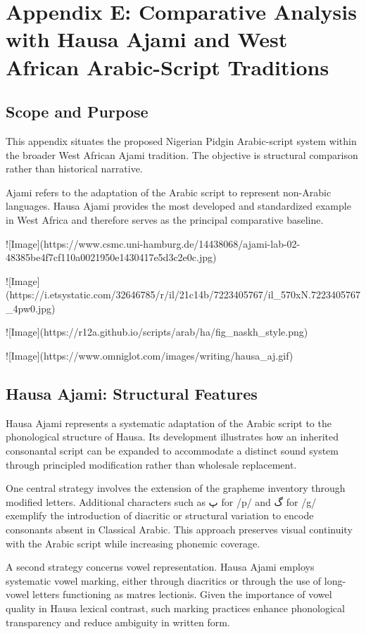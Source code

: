 \documentclass[12pt]{article}
\begin{document}
\section{Appendix E: Comparative Analysis with Hausa Ajami and West African Arabic-Script Traditions}

\subsection{Scope and Purpose}

This appendix situates the proposed Nigerian Pidgin Arabic-script system within the broader West African Ajami tradition. The objective is structural comparison rather than historical narrative.

Ajami refers to the adaptation of the Arabic script to represent non-Arabic languages. Hausa Ajami provides the most developed and standardized example in West Africa and therefore serves as the principal comparative baseline.

![Image](https://www.csmc.uni-hamburg.de/14438068/ajami-lab-02-48385be4f7cf110a0021950e1430417e5d3c2e0c.jpg)

![Image](https://i.etsystatic.com/32646785/r/il/21c14b/7223405767/il_570xN.7223405767_4pw0.jpg)

![Image](https://r12a.github.io/scripts/arab/ha/fig_naskh_style.png)

![Image](https://www.omniglot.com/images/writing/hausa_aj.gif)

\subsection{Hausa Ajami: Structural Features}

Hausa Ajami represents a systematic adaptation of the Arabic script to the phonological structure of Hausa. Its development illustrates how an inherited consonantal script can be expanded to accommodate a distinct sound system through principled modification rather than wholesale replacement.

One central strategy involves the extension of the grapheme inventory through modified letters. Additional characters such as پ for /p/ and گ for /g/ exemplify the introduction of diacritic or structural variation to encode consonants absent in Classical Arabic. This approach preserves visual continuity with the Arabic script while increasing phonemic coverage.

A second strategy concerns vowel representation. Hausa Ajami employs systematic vowel marking, either through diacritics or through the use of long-vowel letters functioning as matres lectionis. Given the importance of vowel quality in Hausa lexical contrast, such marking practices enhance phonological transparency and reduce ambiguity in written form.
\end{document}
